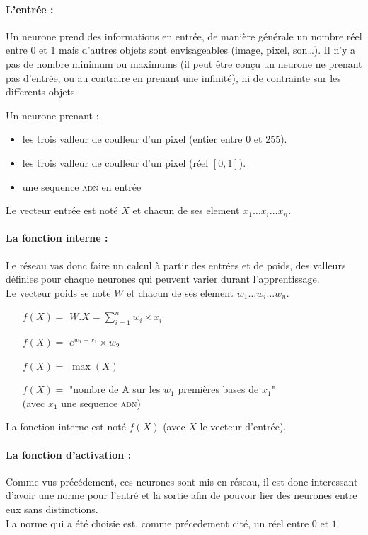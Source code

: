 \paragraph{L'entrée :}
Un neurone prend des informations en entrée, de manière générale un nombre réel entre 0 et 1
mais d'autres objets sont envisageables (image, pixel, son\ldots).
Il n'y a pas de nombre minimum ou maximums
(il peut être conçu un neurone ne prenant pas d'entrée, ou au contraire en prenant une infinité),
ni de contrainte sur les differents objets.
\exemle
{
Un neurone prenant :
\begin{itemize}
    \item les trois valleur de coulleur d'un pixel (entier entre $0$ et $255$).
    \item les trois valleur de coulleur d'un pixel (réel $[0, 1]$).
    \item une sequence \textsc{adn} en entrée

\end{itemize}
}
Le vecteur entrée est noté $X$ et chacun de ses element $x_1 \ldots x_i \ldots x_n$.

\paragraph{La fonction interne :}
Le réseau vas donc faire un calcul à partir des entrées et de poids,
des valleurs définies pour chaque neurones qui peuvent varier durant l'apprentissage. \\
Le vecteur poids se note $W$ et chacun de ses element $w_1 \ldots w_i \ldots w_n$.

\exemle
{
\begin{itemize}
    \item[$f(X) =$] $W.X = \sum_{i=1}^{n} w_i \times x_i $
    \item[$f(X) =$] $e^{w_1 + x_1} \times w_2$
    \item[$f(X) =$] $\max(X)$
    \item[$f(X) =$] "nombre de A sur les $w_1$ premières bases de $x_1$" \\
            (avec $x_1$ une sequence \textsc{adn})
\end{itemize}
}
La fonction interne est noté $f(X)$ (avec $X$ le vecteur d'entrée).

\paragraph{La fonction d'activation :}
Comme vus précédement, ces neurones sont mis en réseau,
il est donc interessant d'avoir une norme pour l'entré et la sortie
afin de pouvoir lier des neurones entre eux sans distinctions. \\
La norme qui a été choisie est, comme précedement cité, un réel entre $0$ et $1$.


